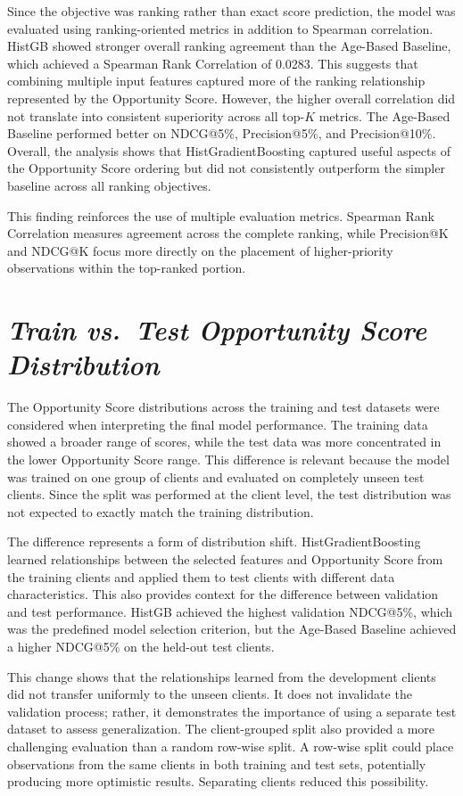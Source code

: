 \documentclass[12pt,a4paper]{report}
\begin{document}
Since the objective was ranking rather than exact score prediction, the model was evaluated using ranking-oriented metrics in addition to Spearman correlation. HistGB showed stronger overall ranking agreement than the Age-Based Baseline, which achieved a Spearman Rank Correlation of 0.0283. This suggests that combining multiple input features captured more of the ranking relationship represented by the Opportunity Score. However, the higher overall correlation did not translate into consistent superiority across all top-$K$ metrics. The Age-Based Baseline performed better on NDCG@5\%, Precision@5\%, and Precision@10\%. Overall, the analysis shows that HistGradientBoosting captured useful aspects of the Opportunity Score ordering but did not consistently outperform the simpler baseline across all ranking objectives.

This finding reinforces the use of multiple evaluation metrics. Spearman Rank Correlation measures agreement across the complete ranking, while Precision@K and NDCG@K focus more directly on the placement of higher-priority observations within the top-ranked portion.

\section{\textit{Train vs.\ Test Opportunity Score Distribution}}
The Opportunity Score distributions across the training and test datasets were considered when interpreting the final model performance. The training data showed a broader range of scores, while the test data was more concentrated in the lower Opportunity Score range. This difference is relevant because the model was trained on one group of clients and evaluated on completely unseen test clients. Since the split was performed at the client level, the test distribution was not expected to exactly match the training distribution.

The difference represents a form of distribution shift. HistGradientBoosting learned relationships between the selected features and Opportunity Score from the training clients and applied them to test clients with different data characteristics. This also provides context for the difference between validation and test performance. HistGB achieved the highest validation NDCG@5\%, which was the predefined model selection criterion, but the Age-Based Baseline achieved a higher NDCG@5\% on the held-out test clients.

This change shows that the relationships learned from the development clients did not transfer uniformly to the unseen clients. It does not invalidate the validation process; rather, it demonstrates the importance of using a separate test dataset to assess generalization. The client-grouped split also provided a more challenging evaluation than a random row-wise split. A row-wise split could place observations from the same clients in both training and test sets, potentially producing more optimistic results. Separating clients reduced this possibility.
\end{document}
